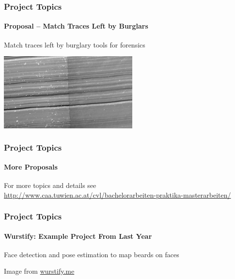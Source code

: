 \documentclass[xetex,professionalfont]{beamer}
\begin{document}
\begin{frame}
\frametitle{Project Topics}
\framesubtitle{Proposal -- Match Traces Left by Burglars}

Match traces left by burglary tools for forensics

\bigskip
\begin{center}
	\includegraphics[width=7cm]{figures/burglary-trace.jpg}
\end{center}

\end{frame}


\begin{frame}
\frametitle{Project Topics}
\framesubtitle{More Proposals}

For more topics and details see \url{http://www.caa.tuwien.ac.at/cvl/bachelorarbeiten-praktika-masterarbeiten/}

\end{frame}


\begin{frame}
\frametitle{Project Topics}
\framesubtitle{Wurstify: Example Project From Last Year}

Face detection and pose estimation to map beards on faces

\bigskip
\begin{center}
	{\centering Image from \url{wurstify.me}}
\end{center}

\end{frame}
\end{document}
